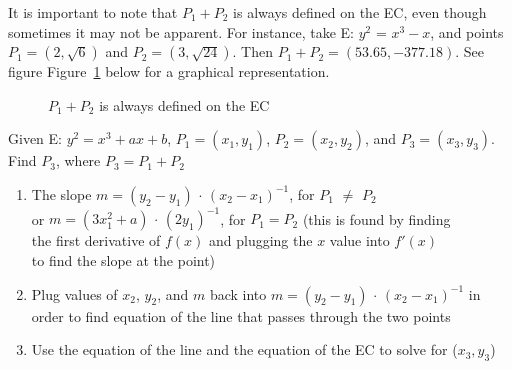 It is important to note that $P_1 + P_2$ is always defined on the EC, even though sometimes it may not be apparent.  For instance, take E: $ y^2$ = $x^3 - x$, and points $P_1 = (2, \sqrt{6})$ and $P_2 = (3, \sqrt{24})$.  Then $P_1 + P_2 = (53.65,-377.18)$. See figure Figure~\ref{fig:DH:DHKE_16} below for a graphical representation.
\begin{figure}[H]
	  \caption{\label{fig:DH:DHKE_16} $P_1 + P_2$ is always defined on the EC}
\end{figure}

\begin{corollary}
Given E: $y^2 = x^3 + ax + b$, $P_1 = (x_1, y_1)$, $P_2 = (x_2, y_2)$, and $P_3 = (x_3, y_3)$. Find $P_3$, where $ P_3 =  P_1 + P_2$
\end{corollary}
\begin{enumerate}[(1)] 
	\item The slope $m =(y_2 - y_1)$ $\cdot$ $(x_2- x_1)^{-1}$, for $P_1$ $\neq$ $P_2$ \\
			\text{ \qquad \: \: \:}or $m = (3x_1^2 + a)$ $\cdot$ $(2y_1)^{-1}$, for $P_1 = P_2$ (this is found by finding\\
			\text{ \qquad \: \: \:}the first derivative of $f(x)$ and plugging the $x$ value into $f'(x)$ \\
			\text{ \qquad \: \: \:}to find the slope at the point)\\
	\item Plug values of $x_2$, $y_2$, and $m$ back into $m =(y_2 - y_1)$ $\cdot$ $(x_2- x_1)^{-1}$ in order to find equation of the line that passes through the two points \\
	\item Use the equation of the line and the equation of the EC to solve for ($x_3, y_3$)
\end {enumerate} 

